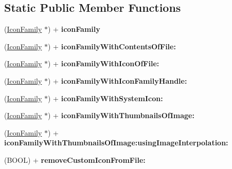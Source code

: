 \subsection*{Static Public Member Functions}
\begin{DoxyCompactItemize}
\item 
\hypertarget{interface_icon_family_a90e6ac9b5dfc124e364aba267b6af2f6}{
(\hyperlink{interface_icon_family}{IconFamily} $\ast$) + {\bfseries iconFamily}}
\label{interface_icon_family_a90e6ac9b5dfc124e364aba267b6af2f6}

\item 
\hypertarget{interface_icon_family_ad5f0a61c5862cae08ab609bb25494c1d}{
(\hyperlink{interface_icon_family}{IconFamily} $\ast$) + {\bfseries iconFamilyWithContentsOfFile:}}
\label{interface_icon_family_ad5f0a61c5862cae08ab609bb25494c1d}

\item 
\hypertarget{interface_icon_family_af428db957426472c61c1b0efa632cfb7}{
(\hyperlink{interface_icon_family}{IconFamily} $\ast$) + {\bfseries iconFamilyWithIconOfFile:}}
\label{interface_icon_family_af428db957426472c61c1b0efa632cfb7}

\item 
\hypertarget{interface_icon_family_a5342c3dca87b7b6527f7e3d2dc1a98cb}{
(\hyperlink{interface_icon_family}{IconFamily} $\ast$) + {\bfseries iconFamilyWithIconFamilyHandle:}}
\label{interface_icon_family_a5342c3dca87b7b6527f7e3d2dc1a98cb}

\item 
\hypertarget{interface_icon_family_ac9ab575c455a86e9b8753eee5a7d5481}{
(\hyperlink{interface_icon_family}{IconFamily} $\ast$) + {\bfseries iconFamilyWithSystemIcon:}}
\label{interface_icon_family_ac9ab575c455a86e9b8753eee5a7d5481}

\item 
\hypertarget{interface_icon_family_a17a358e17f58c428cf06434dd3238669}{
(\hyperlink{interface_icon_family}{IconFamily} $\ast$) + {\bfseries iconFamilyWithThumbnailsOfImage:}}
\label{interface_icon_family_a17a358e17f58c428cf06434dd3238669}

\item 
\hypertarget{interface_icon_family_af568ed6a8fd014a84a9e69b4be328899}{
(\hyperlink{interface_icon_family}{IconFamily} $\ast$) + {\bfseries iconFamilyWithThumbnailsOfImage:usingImageInterpolation:}}
\label{interface_icon_family_af568ed6a8fd014a84a9e69b4be328899}

\item 
\hypertarget{interface_icon_family_a0b7fcb256a6aa6586a30f3d2cec044ba}{
(BOOL) + {\bfseries removeCustomIconFromFile:}}
\label{interface_icon_family_a0b7fcb256a6aa6586a30f3d2cec044ba}


\end{DoxyCompactItemize}
